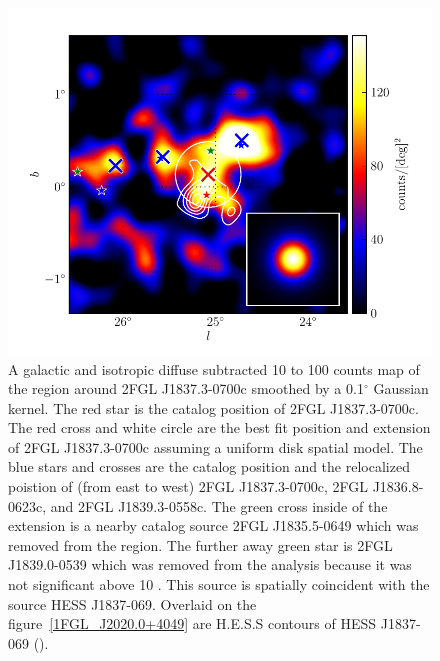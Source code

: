 \documentclass[12pt,preprint]{aastex}
\newcommand{\gev}{\text{GeV}\xspace}
\newcommand{\tev}{\text{TeV}\xspace}
\renewcommand{\deg}{\ensuremath{^\circ}\xspace}
\begin{document}
\begin{figure}
  \begin{center}
    \includegraphics[type=pdf,ext=.pdf,read=.pdf]{source_plots/source_1FGL_J1837.5-0659c}
  \end{center}
  \caption{
  A galactic and isotropic diffuse subtracted 10 \gev to 100 \gev
  counts map of the region around 2FGL J1837.3-0700c smoothed by a
  0.1\deg Gaussian kernel.  The red star is the catalog position of
  2FGL J1837.3-0700c. The red cross and white circle are the best fit
  position and extension  of 2FGL J1837.3-0700c assuming a uniform disk
  spatial model.  The blue stars and crosses are the catalog position and
  the relocalized poistion of (from east to west) 2FGL J1837.3-0700c,
  2FGL J1836.8-0623c, and 2FGL J1839.3-0558c.  The green cross inside
  of the extension is a nearby catalog source 2FGL J1835.5-0649 which
  was removed from the region.  The further away green star is 2FGL
  J1839.0-0539 which was removed from the analysis because it was not
  significant above 10 \gev.  
  This source is spatially coincident with the \tev source HESS J1837-069.
  Overlaid on the figure~\ref{1FGL_J2020.0+4049} are H.E.S.S contours of
  HESS J1837-069 (\cite{HESS_plane_survey}).  
   
  }\label{1FGL_J1837.5-0659c}
\end{figure}
\end{document}
